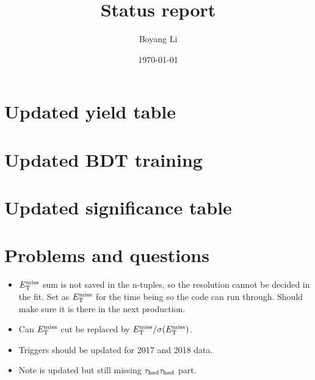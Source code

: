 \documentclass{beamer}
\title{Status report}
\date{\today}
\author[Boyang Li]{
  Boyang Li \\
}
\begin{document}
\begin{frame}
\titlepage
\end{frame}

\section{Updated yield table}
\begin{tiny} 

\end{tiny} 
\newpage
\frame{
\begin{footnotesize} 

\end{footnotesize} 
}
\newpage
\section{Updated BDT training}


\begin{tiny} 

\end{tiny} 
\newpage
\section{Updated significance table}
\begin{tiny} 

\end{tiny} 
\newpage
\frame{
\begin{footnotesize} 

\end{footnotesize} 
}
\section{Problems and questions}
\vspace{50pt}
\begin{itemize}
	\item $E_{\text{T}}^{\text{miss}}$ sum is not saved in the n-tuples, so the resolution cannot be decided in the fit. Set as $E_{\text{T}}^{\text{miss}}$ for the time being so the code can run through. Should make sure it is there in the next production.
	\item Can $E_{\text{T}}^{\text{miss}}$ cut be replaced by $E_{\text{T}}^{\text{miss}}/\sigma(E_{\text{T}}^{\text{miss}})$.
	\item Triggers should be updated for 2017 and 2018 data.
	\item Note is updated but still missing $\tau_\text{had}{}\tau_\text{had}$ part.
\end{itemize}
\end{document}
